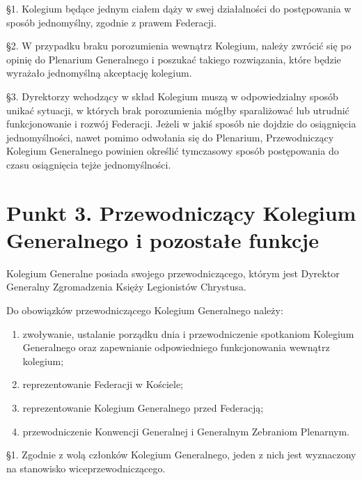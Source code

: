 



 \S{}1. Kolegium będące jednym ciałem dąży w swej działalności do postępowania w sposób jednomyślny, zgodnie z prawem Federacji.


\S{}2. W przypadku braku porozumienia wewnątrz Kolegium, należy zwrócić się po opinię do Plenarium Generalnego i poszukać takiego rozwiązania, które będzie wyrażało jednomyślną akceptację kolegium.


\S{}3. Dyrektorzy wchodzący w skład Kolegium muszą w odpowiedzialny sposób unikać sytuacji, w których brak porozumienia mógłby sparaliżować lub utrudnić funkcjonowanie i rozwój Federacji. Jeżeli w jakiś sposób nie dojdzie do osiągnięcia jednomyślności, nawet pomimo odwołania się do Plenarium, Przewodniczący Kolegium Generalnego powinien określić tymczasowy sposób postępowania do czasu osiągnięcia tejże jednomyślności.
 
\section{Punkt 3. Przewodniczący Kolegium Generalnego i pozostałe funkcje}
 
 Kolegium Generalne posiada swojego przewodniczącego, którym jest Dyrektor Generalny Zgromadzenia Księży Legionistów Chrystusa.
 


 Do obowiązków przewodniczącego Kolegium Generalnego należy:


\begin{enumerate}


\item zwoływanie, ustalanie porządku dnia i przewodniczenie spotkaniom Kolegium Generalnego oraz zapewnianie odpowiedniego funkcjonowania wewnątrz kolegium;


\item reprezentowanie Federacji w Kościele;


\item reprezentowanie Kolegium Generalnego przed Federacją;


\item przewodniczenie Konwencji Generalnej i Generalnym Zebraniom Plenarnym.


\end{enumerate}


\filbreak{}
 \S{}1. Zgodnie z wolą członków Kolegium Generalnego, jeden z nich jest wyznaczony na stanowisko wiceprzewodniczącego.


